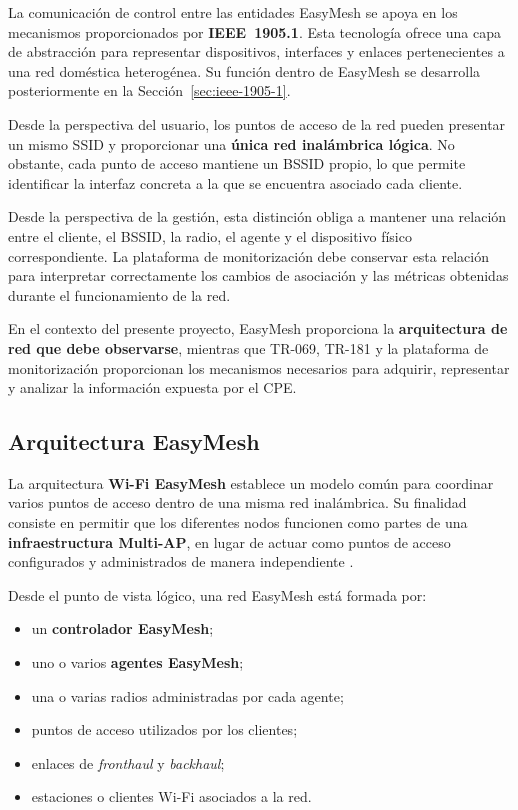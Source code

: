 La comunicación de control entre las entidades EasyMesh se apoya en los
mecanismos proporcionados por \textbf{IEEE~1905.1}. Esta tecnología
ofrece una capa de abstracción para representar dispositivos, interfaces
y enlaces pertenecientes a una red doméstica heterogénea. Su función
dentro de EasyMesh se desarrolla posteriormente en la
Sección~\ref{sec:ieee-1905-1}.

Desde la perspectiva del usuario, los puntos de acceso de la red pueden
presentar un mismo SSID y proporcionar una
\textbf{única red inalámbrica lógica}. No obstante, cada punto de acceso
mantiene un BSSID propio, lo que permite identificar la interfaz concreta
a la que se encuentra asociado cada cliente.

Desde la perspectiva de la gestión, esta distinción obliga a mantener una
relación entre el cliente, el BSSID, la radio, el agente y el dispositivo
físico correspondiente. La plataforma de monitorización debe conservar
esta relación para interpretar correctamente los cambios de asociación y
las métricas obtenidas durante el funcionamiento de la red.

En el contexto del presente proyecto, EasyMesh proporciona la
\textbf{arquitectura de red que debe observarse}, mientras que TR-069,
TR-181 y la plataforma de monitorización proporcionan los mecanismos
necesarios para adquirir, representar y analizar la información expuesta
por el CPE.

\subsection{Arquitectura EasyMesh}
\label{subsec:arquitectura-easymesh}

La arquitectura \textbf{Wi-Fi EasyMesh} establece un modelo común para
coordinar varios puntos de acceso dentro de una misma red inalámbrica.
Su finalidad consiste en permitir que los diferentes nodos funcionen
como partes de una \textbf{infraestructura Multi-AP}, en lugar de actuar
como puntos de acceso configurados y administrados de manera
independiente \cite{wifi_alliance_easymesh}.

Desde el punto de vista lógico, una red EasyMesh está formada por:

\begin{itemize}
    \item un \textbf{controlador EasyMesh};
    \item uno o varios \textbf{agentes EasyMesh};
    \item una o varias radios administradas por cada agente;
    \item puntos de acceso utilizados por los clientes;
    \item enlaces de \textit{fronthaul} y \textit{backhaul};
    \item estaciones o clientes Wi-Fi asociados a la red.
\end{itemize}

